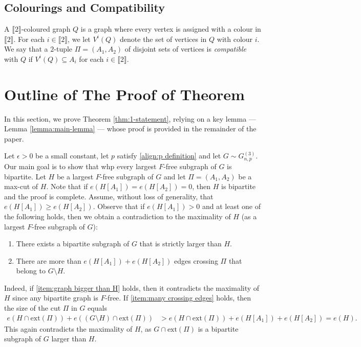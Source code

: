 \documentclass[11pt,a4paper,oneside,reqno]{amsart}
\newcommand{\Gnp}{G_{n, p}^{(3)}}
\newcommand{\1}{\mathbbm{1}} %
\newcommand{\br}[1]{\llbracket{#1}\rrbracket}
\renewcommand{\ge}{\geqslant}
\newcommand{\ext}{\mathrm{ext}}
\begin{document}
\subsection*{Colourings and Compatibility}
A $\br{2}$-coloured graph $Q$ is a graph where every vertex is assigned with a colour in $\br{2}$. For each $i \in \br{2}$, we let $V^i(Q)$ denote the set of vertices in $Q$  with colour $i$. We say that a $2$-tuple $\Pi = (A_1, A_2)$ of disjoint sets of vertices is \textit{compatible} with $Q$ if $V^i(Q) \subseteq A_i$ for each $i \in \br{2}$.

\section{Outline of The Proof of Theorem \normalfont{\ref{thm:1-statement}}}
In this section, we prove Theorem \ref{thm:1-statement}, relying on a key lemma --- Lemma \ref{lemma:main-lemma} --- whose proof is provided in the remainder of the paper.

Let $\epsilon > 0$ be a small constant, let $p$ satisfy \eqref{align:p definition} and let $G \sim \Gnp$. Our main goal is to show that whp every largest $F$-free subgraph of $G$ is bipartite. Let $H$ be a largest $F$-free subgraph of $G$ and let $\Pi = (A_1, A_2)$ be a max-cut of $H$. Note that if $e(H[A_1]) = e(H[A_2]) = 0$, then $H$ is bipartite and the proof is complete. Assume, without loss of generality, that $e(H[A_1]) \ge e(H[A_2])$. Observe that if $e(H[A_1]) > 0$ and at least one of the following holds, then we obtain a contradiction to the maximality of $H$ (as a largest $F$-free subgraph of $G$):
\begin{enumerate}[label=(C\arabic*)]
    \item There exists a bipartite subgraph of $G$ that is strictly larger than $H$.\label{item:graph bigger than H}
    \item There are more than $e(H[A_1]) + e(H[A_2])$ edges crossing $\Pi$ that belong to $G \setminus H$.\label{item:many crossing edges}
\end{enumerate}
Indeed, if \ref{item:graph bigger than H} holds, then it contradicts the maximality of $H$ since any bipartite graph is $F$-free. If \ref{item:many crossing edges} holds, then the size of the cut $\Pi$ in $G$ equals 
\begin{align*}
    e(H \cap \ext(\Pi)) + e((G \setminus H) \cap \ext(\Pi)) &>  e(H \cap \ext(\Pi))  + e(H[A_1]) + e(H[A_2]) = e(H).
\end{align*}
This again contradicts the maximality of $H$, as $G \cap \ext(\Pi)$ is a bipartite subgraph of $G$ larger than $H$.
\end{document}
